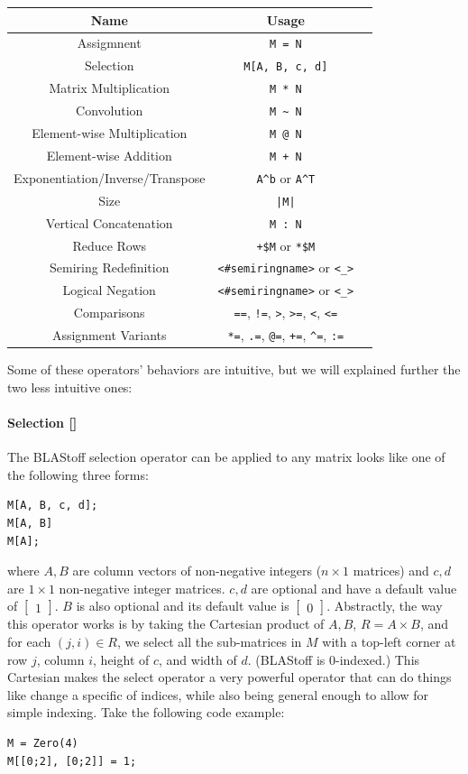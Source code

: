 \begin{center}
\begin{tabular}{|c|c|c|}
\hline
\textbf{Name} & \textbf{Usage}\\
\hline
Assigmnent & \verb|M = N|\\
\hline
Selection & \verb=M[A, B, c, d]=\\
\hline
Matrix Multiplication & \verb=M * N=\\
\hline
Convolution & \verb=M ~ N=\\
\hline
Element-wise Multiplication & \verb=M @ N=\\
\hline
Element-wise Addition & \verb=M + N=\\
\hline
Exponentiation/Inverse/Transpose &  \verb|A^b| or \verb|A^T|\\
\hline
Size & \verb=|M|=\\
\hline
Vertical Concatenation & \verb=M : N=\\
\hline
Reduce Rows & \verb=+$M= or \verb=*$M=\\
\hline
Semiring Redefinition &  \verb=<#semiringname>= or \verb=<_>=\\
\hline
Logical Negation & \verb=<#semiringname>= or \verb=<_>=\\
\hline
Comparisons & \verb|==|, \verb|!=|, \verb|>|, \verb|>=|, \verb|<|, \verb|<=|\\
\hline
Assignment Variants &  \verb|*=|, \verb|.=|, \verb|@=|, \verb|+=|, \verb|^=|, \verb|:=|\\
\hline
\end{tabular}
\end{center}
Some of these operators' behaviors are intuitive, but we will explained further the two less intuitive ones:

\paragraph{Selection []}
The BLAStoff selection operator can be applied to any matrix looks like one of the following three forms:
\begin{lstlisting}
M[A, B, c, d];
M[A, B]
M[A];
\end{lstlisting}
where $A,B$ are column vectors of non-negative integers ($n\times 1$ matrices) and $c,d$ are $1 \times 1$ non-negative integer matrices.  $c,d$ are optional and have a default value of $\begin{bmatrix}1\end{bmatrix}$. $B$ is also optional and its default value is $\begin{bmatrix}0\end{bmatrix}$.  Abstractly, the way this operator works is by taking the Cartesian product of $A,B$, $R=A\times B$, and for each $(j,i)\in R$, we select all the sub-matrices in $M$ with a top-left corner at row $j$, column $i$, height of $c$, and width of $d$.  (BLAStoff is 0-indexed.)  This Cartesian makes the select operator a very powerful operator that can do things like change a specific of indices, while also being general enough to allow for simple indexing.  Take the following code example:
\begin{lstlisting}
M = Zero(4)
M[[0;2], [0;2]] = 1;
\end{lstlisting}

